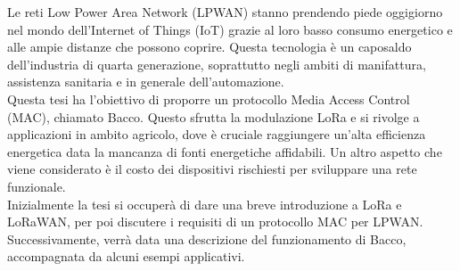 \begin{Sommario}
    \begin{changemargin}{1cm}{1cm}
        Le reti Low Power Area Network (LPWAN) stanno prendendo piede oggigiorno nel mondo dell'Internet of Things
        (IoT) grazie al loro basso consumo energetico e alle ampie distanze che possono coprire. Questa tecnologia è
        un caposaldo dell'industria di quarta generazione, soprattutto negli ambiti di manifattura, assistenza sanitaria e in
        generale dell'automazione.\\
        Questa tesi ha l'obiettivo di proporre un protocollo Media Access Control (MAC), chiamato Bacco. Questo sfrutta la
        modulazione LoRa e si rivolge a applicazioni in ambito agricolo, dove è cruciale raggiungere
        un'alta efficienza energetica data la mancanza di fonti energetiche affidabili. Un altro aspetto
        che viene considerato è il costo dei dispositivi rischiesti per sviluppare una rete funzionale.\\
        Inizialmente la tesi si occuperà di dare una breve introduzione a LoRa e LoRaWAN, per poi discutere i
        requisiti di un protocollo MAC per LPWAN. Successivamente, verrà data una descrizione del funzionamento di
        Bacco, accompagnata da alcuni esempi applicativi.

    \end{changemargin}
\end{Sommario}
